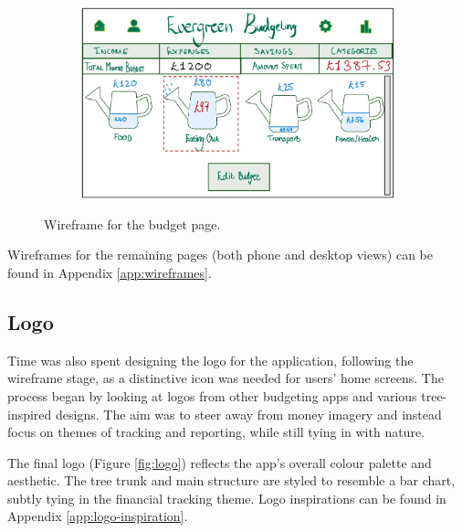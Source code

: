\documentclass{l4proj}
\begin{document}
\begin{figure}[htb] 
    \centering
    \begin{subfigure}[b]{0.6\textwidth}
        \includegraphics[width=\textwidth]{images/Wireframes/wireframe-budget-desktop.png}
    \end{subfigure}   
    \caption{Wireframe for the budget page.}
    \label{fig:wireframe-budget}
\end{figure}

Wireframes for the remaining pages (both phone and desktop views) can be found in Appendix \ref{app:wireframes}.

\subsection{Logo}
Time was also spent designing the logo for the application, following the wireframe stage, as a distinctive icon was needed for users’ home screens. The process began by looking at logos from other budgeting apps and various tree-inspired designs. The aim was to steer away from money imagery and instead focus on themes of tracking and reporting, while still tying in with nature.

The final logo (Figure \ref{fig:logo}) reflects the app’s overall colour palette and aesthetic. The tree trunk and main structure are styled to resemble a bar chart, subtly tying in the financial tracking theme. Logo inspirations can be found in Appendix \ref{app:logo-inspiration}.
\end{document}
